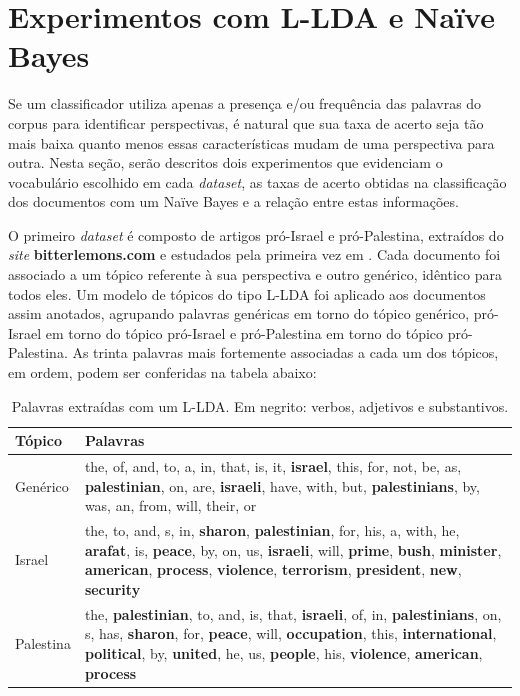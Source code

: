 \section{Experimentos com L-LDA e Naïve Bayes}

Se um classificador utiliza apenas a presença e/ou frequência das palavras do corpus para identificar perspectivas, é natural que sua taxa de acerto seja tão mais baixa quanto menos essas características mudam de uma perspectiva para outra. Nesta seção, serão descritos dois experimentos que evidenciam o vocabulário escolhido em cada \emph{dataset}, as taxas de acerto obtidas na classificação dos documentos com um Naïve Bayes e a relação entre estas informações.

O primeiro \emph{dataset} é composto de artigos pró-Israel e pró-Palestina, extraídos do \emph{site} \textbf{bitterlemons.com} e estudados pela primeira vez em \cite{lin-et-al2006}. Cada documento foi associado a um tópico referente à sua perspectiva e outro genérico, idêntico para todos eles. Um modelo de tópicos do tipo L-LDA foi aplicado aos documentos assim anotados, agrupando palavras genéricas em torno do tópico genérico, pró-Israel em torno do tópico pró-Israel e pró-Palestina em torno do tópico pró-Palestina. As trinta palavras mais fortemente associadas a cada um dos tópicos, em ordem, podem ser conferidas na tabela abaixo:

\begin{table}[h]
\centering
\begin{tabular}{| l | p{10cm} | }
\hline
Tópico & Palavras \\ \hline
Genérico & the, of, and, to, a, in, that, is, it, \textbf{israel}, this, for, not, be, as, \textbf{palestinian}, on, are, \textbf{israeli}, have, with, but, \textbf{palestinians}, by, was, an, from, will, their, or \\ \hline
Israel & the, to, and, s, in, \textbf{sharon}, \textbf{palestinian}, for, his, a, with, he, \textbf{arafat}, is, \textbf{peace}, by, on, us, \textbf{israeli}, will, \textbf{prime}, \textbf{bush}, \textbf{minister}, \textbf{american}, \textbf{process}, \textbf{violence}, \textbf{terrorism}, \textbf{president}, \textbf{new}, \textbf{security} \\ \hline
Palestina & the, \textbf{palestinian}, to, and, is, that, \textbf{israeli}, of, in, \textbf{palestinians}, on, s, has, \textbf{sharon}, for, \textbf{peace}, will, \textbf{occupation}, this, \textbf{international}, \textbf{political}, by, \textbf{united}, he, us, \textbf{people}, his, \textbf{violence}, \textbf{american}, \textbf{process} \\ \hline
\end{tabular}
\label{tab}
\caption{Palavras extraídas com um L-LDA. Em negrito: verbos, adjetivos e substantivos.}
\end{table}


